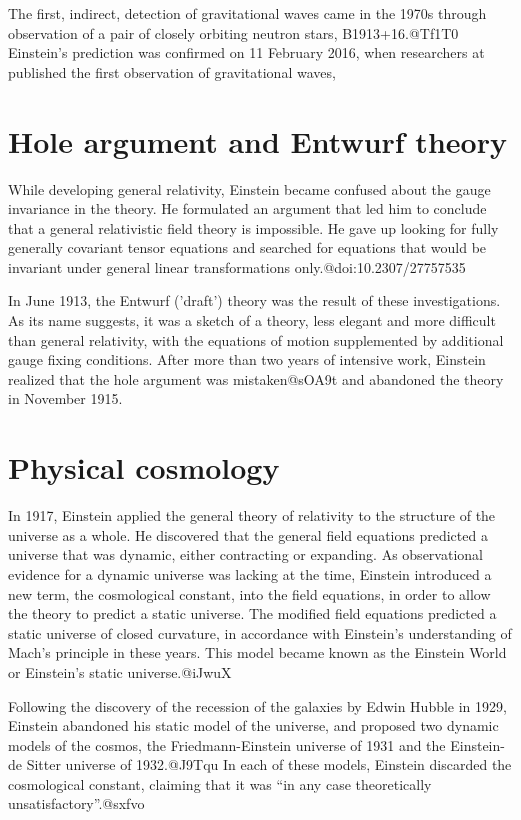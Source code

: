 \documentclass[twoside]{memoir}
\begin{document}
The first, indirect, detection of gravitational waves came in the 1970s through observation of a pair of closely orbiting neutron stars,  B1913+16.@Tf1T0 Einstein's prediction was confirmed on 11 February 2016, when researchers at  published the first observation of gravitational waves,\cite{CO6kH,oSmHb,hkKSp,38Msx}
\section{Hole argument and Entwurf theory}
While developing general relativity, Einstein became confused about the gauge invariance in the theory. He formulated an argument that led him to conclude that a general relativistic field theory is impossible. He gave up looking for fully generally covariant tensor equations and searched for equations that would be invariant under general linear transformations only.@doi:10.2307/27757535

In June 1913, the Entwurf ('draft') theory was the result of these investigations. As its name suggests, it was a sketch of a theory, less elegant and more difficult than general relativity, with the equations of motion supplemented by additional gauge fixing conditions. After more than two years of intensive work, Einstein realized that the hole argument was mistaken@sOA9t and abandoned the theory in November 1915.
\section{Physical cosmology}
In 1917, Einstein applied the general theory of relativity to the structure of the universe as a whole. He discovered that the general field equations predicted a universe that was dynamic, either contracting or expanding. As observational evidence for a dynamic universe was lacking at the time, Einstein introduced a new term, the cosmological constant, into the field equations, in order to allow the theory to predict a static universe. The modified field equations predicted a static universe of closed curvature, in accordance with Einstein's understanding of Mach's principle in these years. This model became known as the Einstein World or Einstein's static universe.@iJwuX

Following the discovery of the recession of the galaxies by Edwin Hubble in 1929, Einstein abandoned his static model of the universe, and proposed two dynamic models of the cosmos, the Friedmann-Einstein universe of 1931 and the Einstein-de Sitter universe of 1932.@J9Tqu In each of these models, Einstein discarded the cosmological constant, claiming that it was \enquote{in any case theoretically unsatisfactory}.@sxfvo
\end{document}
